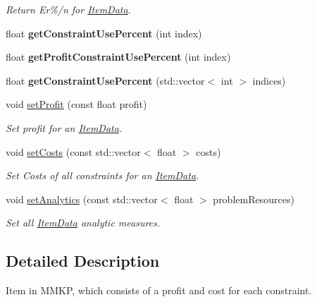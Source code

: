 \begin{DoxyCompactItemize}
\begin{DoxyCompactList}\small\item\em Return Er\%/n for \hyperlink{class_item_data}{Item\+Data}. \end{DoxyCompactList}\item 
\hypertarget{class_item_data_a2735e611eb49cd7b55ee56e3b834f0d4}{float {\bfseries get\+Constraint\+Use\+Percent} (int index)}\label{class_item_data_a2735e611eb49cd7b55ee56e3b834f0d4}

\item 
\hypertarget{class_item_data_a3b0a42c28b6b4db4a2bf31d2c370cd0c}{float {\bfseries get\+Profit\+Constraint\+Use\+Percent} (int index)}\label{class_item_data_a3b0a42c28b6b4db4a2bf31d2c370cd0c}

\item 
\hypertarget{class_item_data_af526fb020485fce4bd68bbf003e18f37}{float {\bfseries get\+Constraint\+Use\+Percent} (std\+::vector$<$ int $>$ indices)}\label{class_item_data_af526fb020485fce4bd68bbf003e18f37}

\item 
\hypertarget{class_item_data_a79caed963f73c2ca4aefaae49c8ea1b1}{void \hyperlink{class_item_data_a79caed963f73c2ca4aefaae49c8ea1b1}{set\+Profit} (const float profit)}\label{class_item_data_a79caed963f73c2ca4aefaae49c8ea1b1}

\begin{DoxyCompactList}\small\item\em Set profit for an \hyperlink{class_item_data}{Item\+Data}. \end{DoxyCompactList}\item 
void \hyperlink{class_item_data_a6bc1758713f145a8821d57c40547c2cb}{set\+Costs} (const std\+::vector$<$ float $>$ costs)
\begin{DoxyCompactList}\small\item\em Set Costs of all constraints for an \hyperlink{class_item_data}{Item\+Data}. \end{DoxyCompactList}\item 
void \hyperlink{class_item_data_a138d46bf17af403471f4bf46a8e44d50}{set\+Analytics} (const std\+::vector$<$ float $>$ problem\+Resources)
\begin{DoxyCompactList}\small\item\em Set all \hyperlink{class_item_data}{Item\+Data} analytic measures. \end{DoxyCompactList}\end{DoxyCompactItemize}


\subsection{Detailed Description}
Item in M\+M\+K\+P, which consists of a profit and cost for each constraint. 

